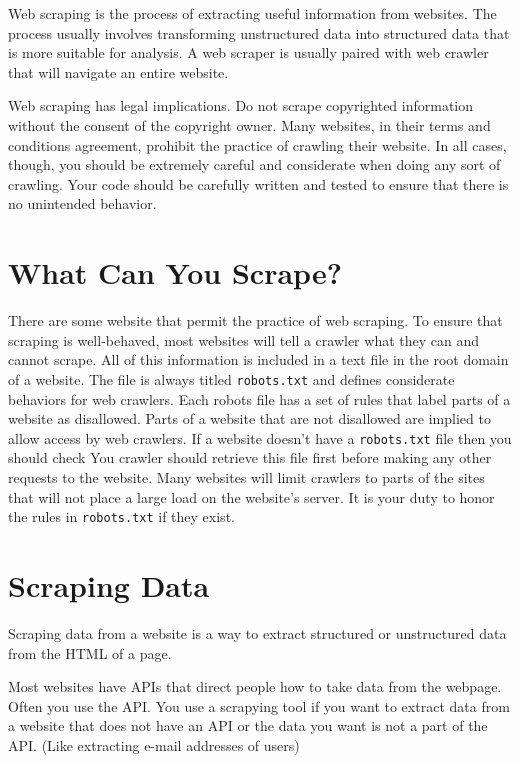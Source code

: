 
Web scraping is the process of extracting useful information from websites.
The process usually involves transforming unstructured data into structured data that is more 
suitable for analysis.
A web scraper is usually paired with web crawler that will navigate an entire website.

\begin{warn}
Web scraping has legal implications.
Do not scrape copyrighted information without the consent of the copyright owner.
Many websites, in their terms and conditions agreement, prohibit the practice of crawling their 
website.
In all cases, though, you should be extremely careful and considerate when doing any sort of 
crawling.
Your code should be carefully written and tested to ensure that there is no unintended behavior.
\end{warn}

\section*{What Can You Scrape?}
There are some website that permit the practice of web scraping.
To ensure that scraping is well-behaved, most websites will tell a crawler what they can and cannot 
scrape.
All of this information is included in a text file in the root domain of a website.
The file is always titled \texttt{robots.txt} and defines considerate behaviors for web crawlers.
Each robots file has a set of rules that label parts of a website as disallowed.
Parts of a website that are not disallowed are implied to allow access by web crawlers.
If a website doesn't have a \texttt{robots.txt} file then you should check
You crawler should retrieve this file first before making any other requests to the website.
Many websites will limit crawlers to parts of the sites that will not place a large load on the 
website's server.
It is your duty to honor the rules in \texttt{robots.txt} if they exist.

\section*{Scraping Data}
Scraping data from a website is a way to extract structured or unstructured data from the HTML of a page.

Most websites have APIs that direct people how to take data from the webpage. Often you use the API. You use a scrapying tool if you want to extract data from a website that does not have an API or the data you want is not a part of the API. (Like extracting e-mail addresses of users)

